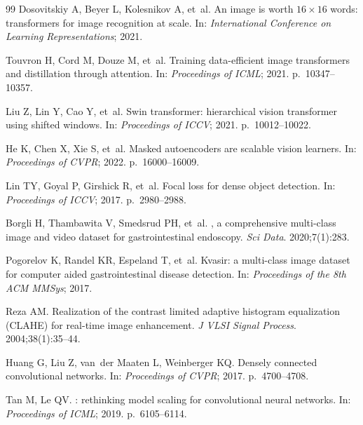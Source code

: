 \documentclass[10pt,a4paper,twocolumn]{article}
\begin{document}
\begin{thebibliography}{99}
Dosovitskiy A, Beyer L, Kolesnikov A, et~al.
\newblock An image is worth $16\times16$ words: transformers for image
  recognition at scale.
\newblock In: \emph{International Conference on Learning Representations};
  2021.

Touvron H, Cord M, Douze M, et~al.
\newblock Training data-efficient image transformers and distillation through
  attention.
\newblock In: \emph{Proceedings of ICML}; 2021. p.~10347--10357.

Liu Z, Lin Y, Cao Y, et~al.
\newblock Swin transformer: hierarchical vision transformer using shifted
  windows.
\newblock In: \emph{Proceedings of ICCV}; 2021. p.~10012--10022.

He K, Chen X, Xie S, et~al.
\newblock Masked autoencoders are scalable vision learners.
\newblock In: \emph{Proceedings of CVPR}; 2022. p.~16000--16009.

Lin TY, Goyal P, Girshick R, et~al.
\newblock Focal loss for dense object detection.
\newblock In: \emph{Proceedings of ICCV}; 2017. p.~2980--2988.

Borgli H, Thambawita V, Smedsrud PH, et~al.
, a comprehensive multi-class image and video dataset
  for gastrointestinal endoscopy.
\newblock \emph{Sci Data}. 2020;7(1):283.

Pogorelov K, Randel KR, Espeland T, et~al.
\newblock Kvasir: a multi-class image dataset for computer aided
  gastrointestinal disease detection.
\newblock In: \emph{Proceedings of the 8th ACM MMSys}; 2017.

Reza AM.
\newblock Realization of the contrast limited adaptive histogram equalization
  ({CLAHE}) for real-time image enhancement.
\newblock \emph{J VLSI Signal Process}. 2004;38(1):35--44.

Huang G, Liu Z, van~der Maaten L, Weinberger KQ.
\newblock Densely connected convolutional networks.
\newblock In: \emph{Proceedings of CVPR}; 2017. p.~4700--4708.

Tan M, Le QV.
: rethinking model scaling for convolutional neural
  networks.
\newblock In: \emph{Proceedings of ICML}; 2019. p.~6105--6114.


\end{thebibliography}
\end{document}
